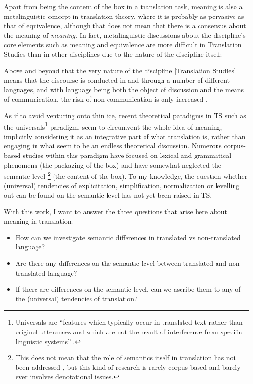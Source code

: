 Apart from being the content of the box in a translation task, meaning is also a metalinguistic concept in translation theory, where it is probably as pervasive as that of equivalence, although that does not mean that there is a consensus about the meaning of \textit{meaning.} In fact, metalinguistic discussions about the discipline’s core elements such as meaning and equivalence are more difficult in Translation Studies than in other disciplines due to the nature of the discipline itself: 

Above and beyond that the very nature of the discipline [Translation Studies] means that the discourse is conducted in and through a number of different languages, and with language being both the object of discussion and the means of communication, the risk of non-communication is only increased \citep[314]{snell-hornby_whats_2007}.

As if to avoid venturing onto thin ice, recent theoretical paradigms in TS such as the universals\footnote{Universals are “features which typically occur in translated text rather than original utterances and which are not the result of interference from specific linguistic systems” \citep[243]{baker_corpus_1993}.} paradigm, seem to circumvent the whole idea of meaning, implicitly considering it as an integrative part of what translation is, rather than engaging in what seem to be an endless theoretical discussion. Numerous corpus-based studies within this paradigm \citep{poyatos_punctuation_1997,laviosa_core_1998, laviosa_corpus-based_2002,olohan_strange_2000,olohan_reporting_2000,baker_corpus-based_2004,bernardini_practice_2011,delaere_is_2012,oakes_lexical_2012,kruger_corpus-based_2012} have focused on lexical and grammatical phenomena (the packaging of the box) and have somewhat neglected the semantic level \citep[28]{laviosa_corpus-based_2002}\footnote{This does not mean that the role of semantics itself in translation has not been addressed \citep{lewandowska-tomasczyk_specification_2010}, but this kind of research is rarely corpus-based and barely ever involves denotational issues.} (the content of the box). To my knowledge, the question whether (universal) tendencies of explicitation, simplification, normalization or levelling out can be found on the semantic level has not yet been raised in TS.

With this work, I want to answer the three questions that arise here about meaning in translation:

\begin{itemize}
\item 
How can we investigate semantic differences in translated vs non-translated language?
\item 
Are there any differences on the semantic level between translated and non-translated language? 
\item 
If there are differences on the semantic level, can we ascribe them to any of the (universal) tendencies of translation?
\end{itemize}

